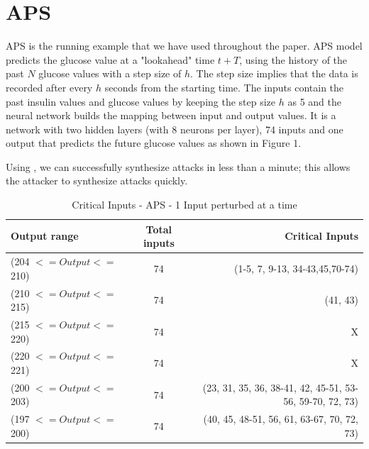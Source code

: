 \section{APS}
APS is the running example that we have used throughout the paper. 
APS model predicts the glucose value at a "lookahead" time $t + T$, using the history of the past $N$ glucose values with a step size of $h$. The step size implies that the data is recorded after every $h$ seconds from the starting time. The inputs contain the past insulin values and glucose values by keeping the step size $h$ as 5 and the neural network builds the mapping between input and output values. It is a network with two hidden layers (with 8 neurons per layer), 74 inputs and one output that predicts the future glucose values as shown in Figure 1. 

Using \tool, we can successfully synthesize attacks in less than a minute; this allows the attacker to synthesize attacks quickly. 



\begin{table}[h!]
	\begin{center}
		\caption{Critical Inputs - APS - 1 Input perturbed at a time}
		\label{tab:table3}
		\begin{tabular}{l|S|r}
			\textbf{Output range} & \textbf{Total inputs} & \textbf{Critical Inputs}  \\
			\hline
			(204 $<= Output <=$ 210) &  74&  (1-5, 7, 9-13, 34-43,45,70-74) \\
			
		
			(210 $<= Output <=$ 215) &  74&   (41, 43)\\
			(215 $<= Output <=$ 220) &  74&  X \\
			(220 $<= Output <=$ 221) &  74&  X \\
			(200 $<= Output <=$ 203) &  74&  (23, 31, 35, 36, 38-41, 42, 45-51, 53-56, 59-70, 72, 73) \\
			(197 $<= Output <=$200) & 74& (40, 45, 48-51, 56, 61, 63-67, 70, 72, 73)\\
			\hline
			\hline
			
		
		\end{tabular}
	\end{center}
\end{table}


